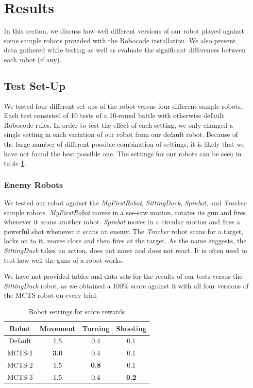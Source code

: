 \section{Results}
\label{05}
In this section, we discuss how well different versions of our robot played against some sample robots provided with the Robocode installation. We also present data gathered while testing as well as evaluate the significant differences between each robot (if any).

\subsection{Test Set-Up}
We tested four different set-ups of the robot versus four different sample robots. Each test consisted of 10 tests of a 10-round battle with otherwise default Robocode rules. In order to test the effect of each setting, we only changed a single setting in each variation of our robot from our default robot. Because of the large number of different possible combination of settings, it is likely that we have not found the best possible one. The settings for our robots can be seen in table \ref{table-robotsettings}.

\subsubsection{Enemy Robots} 
We tested our robot against the \textit{MyFirstRobot}, \textit{SittingDuck}, \textit{Spinbot}, and \textit{Tracker} sample robots. \textit{MyFirstRobot} moves in a see-saw motion, rotates its gun and fires whenever it scans another robot. \textit{Spinbot} moves in a circular motion and fires a powerful shot whenever it scans an enemy. The \textit{Tracker} robot scans for a target, locks on to it, moves close and then fires at the target. As the name suggests, the \textit{SittingDuck} takes no action, does not move and does not react. It is often used to test how well the guns of a robot works.

We have not provided tables and data sets for the results of our tests versus the \textit{SittingDuck} robot, as we obtained a 100\% score against it with all four versions of the MCTS robot on every trial. 

\begin{table}
\begin{center}
\renewcommand{\arraystretch}{1}
\caption{Robot settings for score rewards}
\label{table-robotsettings}
\begin{tabular}{|c | c | c |c |}
\hline
Robot & Movement & Turning & Shooting\\
\hline
Default & 1.5 & 0.4 & 0.1\\
\hline
MCTS-1 & \textbf{3.0} & 0.4 & 0.1\\
\hline
MCTS-2 & 1.5 & \textbf{0.8} & 0.1\\
\hline
MCTS-3 & 1.5 & 0.4 & \textbf{0.2}\\
\hline
\end{tabular}
\end{center}
\end{table}

